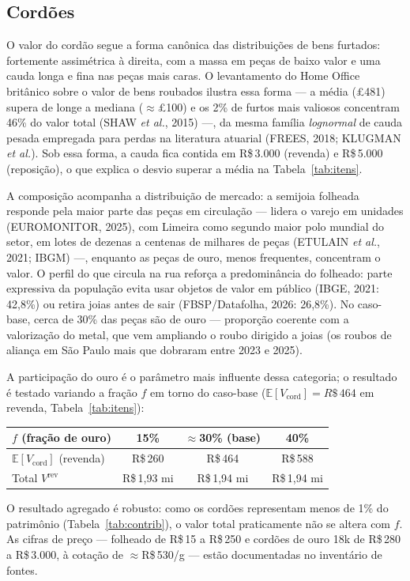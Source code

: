 \documentclass[11pt,a4paper]{article}
\newcommand{\reais}[1]{R\$\,#1}
\begin{document}
\subsection{Cordões}
O valor do cordão segue a forma canônica das distribuições de bens furtados: fortemente
assimétrica à direita, com a massa em peças de baixo valor e uma cauda longa e fina nas peças mais
caras. O levantamento do Home Office britânico sobre o valor de bens roubados ilustra essa forma
--- a média (\pounds481) supera de longe a mediana ($\approx$\pounds100) e os 2\% de furtos mais
valiosos concentram 46\% do valor total (SHAW \emph{et al.}, 2015) ---, da mesma família
\emph{lognormal} de cauda pesada empregada para perdas na literatura atuarial (FREES, 2018; KLUGMAN
\emph{et al.}). Sob essa forma, a cauda fica contida em \reais{3.000} (revenda) e \reais{5.000}
(reposição), o que explica o desvio superar a média na Tabela~\ref{tab:itens}.

A composição acompanha a distribuição de mercado: a semijoia folheada responde pela maior parte das
peças em circulação --- lidera o varejo em unidades (EUROMONITOR, 2025), com Limeira como segundo
maior polo mundial do setor, em lotes de dezenas a centenas de milhares de peças (ETULAIN
\emph{et al.}, 2021; IBGM) ---, enquanto as peças de ouro, menos frequentes, concentram o valor. O
perfil do que circula na rua reforça a predominância do folheado: parte expressiva da população
evita usar objetos de valor em público (IBGE, 2021: 42,8\%) ou retira joias antes de sair
(FBSP/Datafolha, 2026: 26,8\%). No caso-base, cerca de 30\% das peças são de ouro --- proporção
coerente com a valorização do metal, que vem ampliando o roubo dirigido a joias (os roubos de
aliança em São Paulo mais que dobraram entre 2023 e 2025).

A participação do ouro é o parâmetro mais influente dessa categoria; o resultado é testado variando
a fração $f$ em torno do caso-base ($\mathbb{E}[V_{\text{cord}}]=\reais{464}$ em revenda,
Tabela~\ref{tab:itens}):
\begin{center}\small
\begin{tabular}{lccc}
\toprule
$f$ (fração de ouro) & 15\% & $\approx$30\% (base) & 40\% \\
\midrule
$\mathbb{E}[V_{\text{cord}}]$ (revenda) & \reais{260} & \reais{464} & \reais{588} \\
Total $V^{\text{rev}}$ & \reais{1{,}93} mi & \reais{1{,}94} mi & \reais{1{,}94} mi \\
\bottomrule
\end{tabular}
\end{center}
O resultado agregado é robusto: como os cordões representam menos de 1\% do patrimônio
(Tabela~\ref{tab:contrib}), o valor total praticamente não se altera com $f$. As cifras de preço
--- folheado de \reais{15} a \reais{250} e cordões de ouro 18k de \reais{280} a \reais{3.000}, à
cotação de $\approx$\reais{530}/g --- estão documentadas no inventário de fontes.
\end{document}
